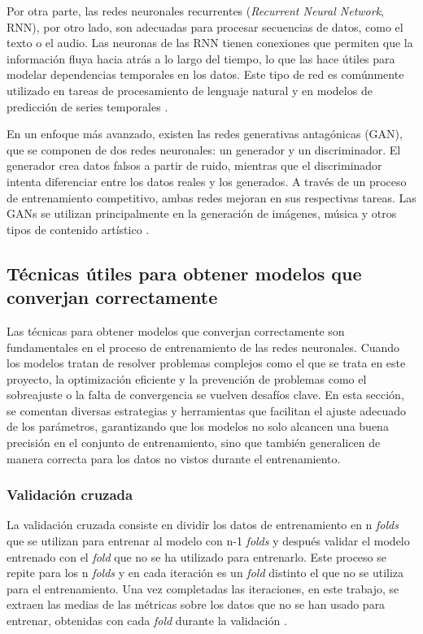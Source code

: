 Por otra parte, las redes neuronales recurrentes (\textit{Recurrent Neural Network}, RNN), por otro lado, son adecuadas para procesar secuencias de datos, como el texto o el audio. Las neuronas de las RNN tienen conexiones que permiten que la información fluya hacia atrás a lo largo del tiempo, lo que las hace útiles para modelar dependencias temporales en los datos. Este tipo de red es comúnmente utilizado en tareas de procesamiento de lenguaje natural y en modelos de predicción de series temporales \cite{haykin2009neural}.

En un enfoque más avanzado, existen las redes generativas antagónicas (GAN), que se componen de dos redes neuronales: un generador y un discriminador. El generador crea datos falsos a partir de ruido, mientras que el discriminador intenta diferenciar entre los datos reales y los generados. A través de un proceso de entrenamiento competitivo, ambas redes mejoran en sus respectivas tareas. Las GANs se utilizan principalmente en la generación de imágenes, música y otros tipos de contenido artístico \cite{nielsen2015neural}.



\subsection{Técnicas útiles para obtener modelos que converjan correctamente}
Las técnicas para obtener modelos que converjan correctamente son fundamentales en el proceso de entrenamiento de las redes neuronales. Cuando los modelos tratan de resolver problemas complejos como el que se trata en este proyecto, la optimización eficiente y la prevención de problemas como el sobreajuste o la falta de convergencia se vuelven desafíos clave. En esta sección, se comentan diversas estrategias y herramientas que facilitan el ajuste adecuado de los parámetros, garantizando que los modelos no solo alcancen una buena precisión en el conjunto de entrenamiento, sino que también generalicen de manera correcta para los datos no vistos durante el entrenamiento.

\subsubsection{Validación cruzada} \label{subsubsection:cv}
La validación cruzada consiste en dividir los datos de entrenamiento en n \textit{folds} que se utilizan para entrenar al modelo con n-1 \textit{folds} y después validar el modelo entrenado con el \textit{fold} que no se ha utilizado para entrenarlo. Este proceso se repite para los n \textit{folds} y en cada iteración es un \textit{fold} distinto el que no se utiliza para el entrenamiento. Una vez completadas las iteraciones, en este trabajo, se extraen las medias de las métricas sobre los datos que no se han usado para entrenar, obtenidas con cada \textit{fold} durante la validación \cite{hastie2009elements}.

